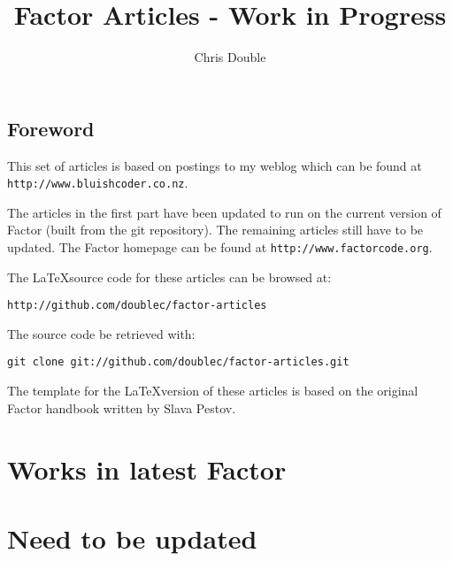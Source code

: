\documentclass{book}
\begin{document}
\title{Factor Articles - Work in Progress}

\author{Chris Double}

\maketitle
\tableofcontents{}

\chapter*{Foreword}

This set of articles is based on postings to my weblog which can be found at \verb|http://www.bluishcoder.co.nz|.

The articles in the first part have been updated to run on the current version of Factor (built from the git repository). The remaining articles still have to be updated. The Factor homepage can be found at \verb|http://www.factorcode.org|.

The \LaTeX source code for these articles can be browsed at:
\begin{verbatim}
http://github.com/doublec/factor-articles
\end{verbatim}

The source code be retrieved with:
\begin{verbatim}
git clone git://github.com/doublec/factor-articles.git
\end{verbatim}

The template for the \LaTeX version of these articles is based on the original Factor handbook written by Slava Pestov.

\part{Works in latest Factor}






\part{Need to be updated}
















\end{document}
